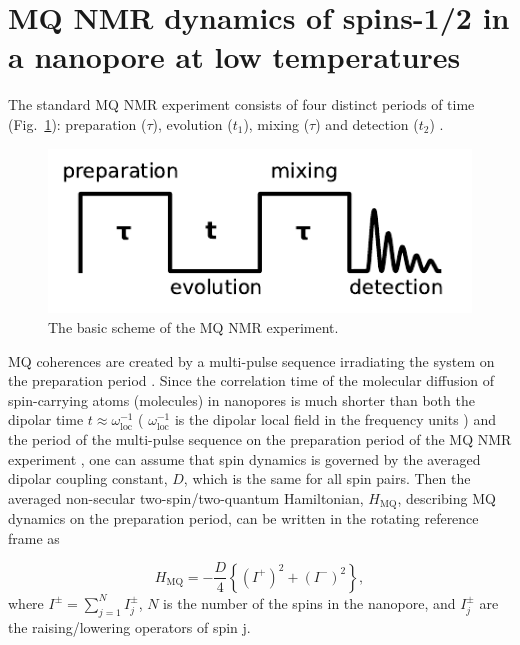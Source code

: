 \section{MQ NMR dynamics of spins-1/2 in a nanopore at low temperatures}
\label{sec:mq_dyn}

The standard MQ NMR experiment consists of four distinct periods of time (Fig.~\ref{fig:experiment}): preparation ($\tau$), evolution ($t_1$), mixing ($\tau$) and detection ($t_2$) \cite{mq_nmr_experiment}.
\begin{figure}
    \centering
    \includegraphics[width=\linewidth]{src/experiment.pdf}
    \caption{The basic scheme of the MQ NMR experiment.}
    \label{fig:experiment}
\end{figure}
MQ coherences are created by a multi-pulse sequence irradiating the system on the preparation period \cite{mq_nmr_experiment}. Since the correlation time of the molecular diffusion of spin-carrying atoms (molecules) in nanopores is much shorter than both the dipolar time $t \approx \omega^{-1}_{\mathrm{loc}}$ ( $\omega^{-1}_{\mathrm{loc}}$  is the dipolar local field in the frequency units \cite{Goldman}) and  the period of the multi-pulse sequence on the preparation period of the MQ NMR experiment \cite{mq_nmr_experiment}, one can assume that spin dynamics is governed by the averaged dipolar coupling constant, $D$, which is the same for all spin pairs. Then the averaged non-secular two-spin/two-quantum Hamiltonian, $H_\mathrm{MQ}$, describing MQ dynamics on the preparation period, can be written in the rotating reference frame \cite{Goldman} as \cite{lab:mq_nmr_dyn_in_nanopores_2009}

\begin{equation}
    \label{eq:ham_mq}
    H_\mathrm{MQ}  = - \frac D 4 \left\{(I^+)^2 + (I^-)^2\right\},
\end{equation}
where  $I^{\pm} = \sum\limits_{j=1}^N I^{\pm}_j$, $N$ is the number of the spins in the nanopore, and $I^{\pm}_j$ are the raising/lowering operators of spin j.

